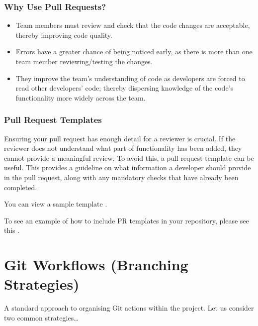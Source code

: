 \documentclass[letterpaper,10pt,english]{jupyterBook}
\begin{document}
\subsubsection{Why Use Pull Requests?}
\label{\detokenize{chapter_6/github:why-use-pull-requests}}\begin{itemize}
\item {} 
\sphinxAtStartPar
Team members must review and check that the code changes are
acceptable, thereby improving code quality.

\item {} 
\sphinxAtStartPar
Errors have a greater chance of being noticed early, as there is
more than one team member reviewing/testing the changes.

\item {} 
\sphinxAtStartPar
They improve the team’s understanding of code as developers are
forced to read other developers’ code; thereby dispersing knowledge
of the code’s functionality more widely across the team.

\end{itemize}


\subsubsection{Pull Request Templates}
\label{\detokenize{chapter_6/github:pull-request-templates}}
\sphinxAtStartPar
Ensuring your pull request has enough detail for a reviewer is crucial.
If the reviewer does not understand what part of functionality has been
added, they cannot provide a meaningful review. To avoid this, a pull
request template can be useful. This provides a guideline on what
information a developer should provide in the pull request, along with
any mandatory checks that have already been completed.

\sphinxAtStartPar
You can view a sample template
.

\sphinxAtStartPar
To see an example of how to include PR templates in your repository,
please see this
.


\section{Git Workflows (Branching Strategies)}
\label{\detokenize{chapter_6/github:git-workflows-branching-strategies}}
\sphinxAtStartPar
A standard approach to organising Git actions within the project. Let us
consider two common strategies…
\end{document}
